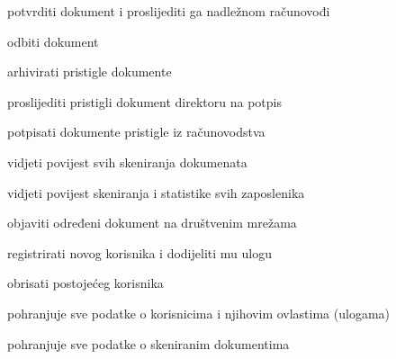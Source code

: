 \begin{packed_enum}
\begin{packed_enum}
						\begin{packed_enum}
							
							\item potvrditi dokument i proslijediti ga nadležnom računovođi
							\item odbiti dokument

						\end{packed_enum}
					
				\end{packed_enum}

				\item  {}

				\begin{packed_enum}
					
					\item arhivirati pristigle dokumente
					\item proslijediti pristigli dokument direktoru na potpis
					
				\end{packed_enum}

				\item  {}

				\begin{packed_enum}
					
					\item potpisati dokumente pristigle iz računovodstva
					\item vidjeti povijest svih skeniranja dokumenata
					\item vidjeti povijest skeniranja i statistike svih zaposlenika
					\item objaviti određeni dokument na društvenim mrežama 
					\item registrirati novog korisnika i dodijeliti mu ulogu
					\item obrisati postojećeg korisnika
					
				\end{packed_enum}

				\item  {}

				\begin{packed_enum}

					\item pohranjuje sve podatke o korisnicima i njihovim ovlastima (ulogama)
					\item pohranjuje sve podatke o skeniranim dokumentima
					
				\end{packed_enum}			

			\end{packed_enum}
	
